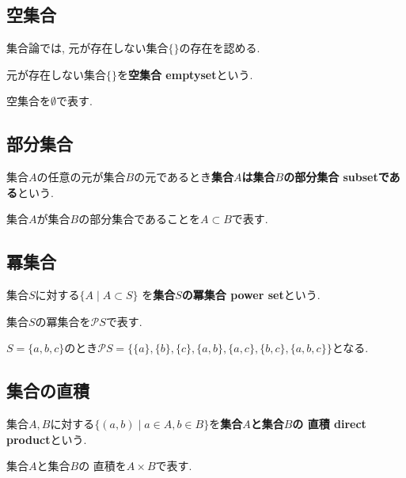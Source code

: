 \subsection{空集合}
集合論では, 元が存在しない集合$\{\}$の存在を認める.
\begin{Def}
元が存在しない集合$\{\}$を{\bf 空集合 emptyset}という.
\end{Def}
\begin{Notation}
空集合を$\emptyset$で表す.
\end{Notation}
\subsection{部分集合}
\begin{Def}
集合$A$の任意の元が集合$B$の元であるとき{\bf 集合$A$は集合$B$の部分集合 subsetである}という.  
\end{Def}
\begin{Notation}
集合$A$が集合$B$の部分集合であることを$A\subset B$で表す.
\end{Notation}
\subsection{冪集合}
\begin{Def}
集合$S$に対する$\{A\mid A\subset S\}$
を{\bf 集合$S$の冪集合 power set}という.
\end{Def}
\begin{Notation}
集合$S$の冪集合を$\mathcal{P}S$で表す.
\end{Notation}
\begin{example}
$S=\{a,b,c\}$のとき$\mathcal{P} S=\{\{a\},\{b\},\{c\},\{a,b\},\{a,c\},\{b,c\},\{a,b,c\}\}$となる.
\end{example}

\subsection{集合の直積}
\begin{Def}
集合$A,B$に対する$\{(a,b)\mid a\in A, b\in B\}$を{\bf 集合$A$と集合$B$の
直積 direct product}という.
\end{Def}
\begin{Notation}
集合$A$と集合$B$の
直積を$A\times B$で表す.
\end{Notation}
\begin{comment}
実は, 集合を「ものの集まり」と素朴に定義することは, 矛盾を孕んでいる. この矛盾を避けるための議論はのちに行う. 
また, 集合論の公理には立ち入らないこととする.
\end{comment}
